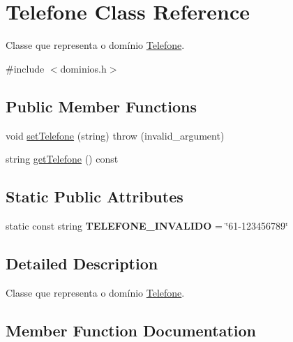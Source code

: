 \hypertarget{classTelefone}{}\section{Telefone Class Reference}
\label{classTelefone}


Classe que representa o domínio \hyperlink{classTelefone}{Telefone}.  




{\ttfamily \#include $<$dominios.\+h$>$}

\subsection*{Public Member Functions}
\begin{DoxyCompactItemize}
\item 
void \hyperlink{classTelefone_a79516b37434ff927bd2a9bd66080a36d}{set\+Telefone} (string)  throw (invalid\+\_\+argument)
\item 
string \hyperlink{classTelefone_a64d1e99657fde65bb698ddcd56e7eb04}{get\+Telefone} () const
\end{DoxyCompactItemize}
\subsection*{Static Public Attributes}
\begin{DoxyCompactItemize}
\item 
\mbox{\label{classTelefone_a39757413cc079f627d68dff91adfdeff}} 
static const string {\bfseries T\+E\+L\+E\+F\+O\+N\+E\+\_\+\+I\+N\+V\+A\+L\+I\+DO} = \char`\"{}61-\/123456789\char`\"{}
\end{DoxyCompactItemize}


\subsection{Detailed Description}
Classe que representa o domínio \hyperlink{classTelefone}{Telefone}. 

\subsection{Member Function Documentation}
\mbox{\label{classTelefone_a64d1e99657fde65bb698ddcd56e7eb04}} 
